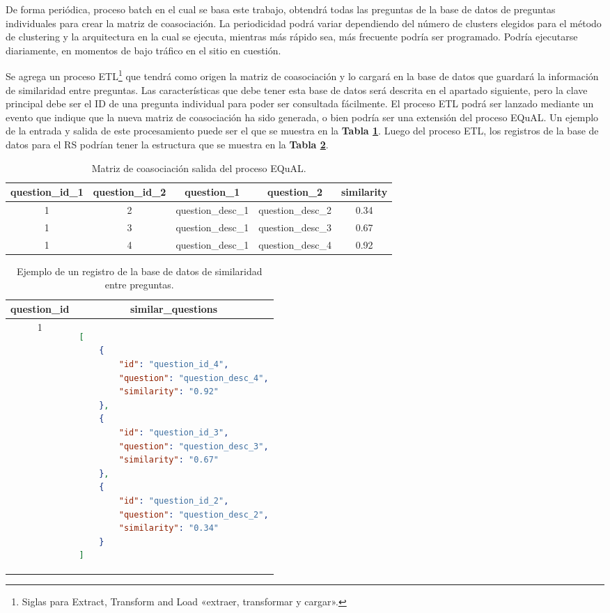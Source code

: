 \bigskip De forma periódica, proceso batch en el cual se basa este trabajo, obtendrá todas las preguntas de la base de datos de preguntas individuales para crear la matriz de coasociación. La periodicidad podrá variar dependiendo del número de clusters elegidos para el método de clustering y la arquitectura en la cual se ejecuta, mientras más rápido sea, más frecuente podría ser programado. Podría ejecutarse diariamente, en momentos de bajo tráfico en el sitio en cuestión.

\bigskip Se agrega un proceso ETL\footnote{Siglas para Extract, Transform and Load «extraer, transformar y cargar».} que tendrá como origen la matriz de coasociación y lo cargará en la base de datos que guardará la información de similaridad entre preguntas.  Las características que debe tener esta base de datos será descrita en el apartado siguiente, pero la clave principal debe ser el ID de una pregunta individual para poder ser consultada fácilmente. El proceso ETL podrá ser lanzado mediante un evento que indique que la nueva matriz de coasociación ha sido generada, o bien podría ser una extensión del proceso EQuAL. Un ejemplo de la entrada y salida de este procesamiento puede ser el que se muestra en la \textbf{Tabla \ref{tab:table-co-asociation}}. Luego del proceso ETL, los registros de la base de datos para el RS podrían tener la estructura que se muestra en la \textbf{Tabla \ref{tab:table-similar-questions}}.

\begin{table}[]
	\centering
	\begin{tabular}{|c|c|c|c|c|}
		\hline
		\textbf{question\_id\_1} & \textbf{question\_id\_2} & \textbf{question\_1} & \textbf{question\_2} & \textbf{similarity} \\ \hline
		1 & 2 & question\_desc\_1 & question\_desc\_2 & 0.34 \\ \hline
		1 & 3 & question\_desc\_1 & question\_desc\_3 & 0.67 \\ \hline
		1 & 4 & question\_desc\_1 & question\_desc\_4 & 0.92 \\ \hline
	\end{tabular}
	\caption{Matriz de coasociación salida del proceso EQuAL.}
	\label{tab:table-co-asociation}
\end{table}

\begin{table}[]
	\centering
	\begin{tabular}{|c|l|}
		\hline
		\textbf{question\_id} &
		\multicolumn{1}{c|}{\textbf{similar\_questions}} \\ \hline
		1 & \begin{lstlisting}[language=json]
[
	{
		"id": "question_id_4",
		"question": "question_desc_4",
		"similarity": "0.92"
	},
	{
		"id": "question_id_3",
		"question": "question_desc_3",
		"similarity": "0.67"
	},
	{
		"id": "question_id_2",
		"question": "question_desc_2",
		"similarity": "0.34"
	}
]
		\end{lstlisting} \\ \hline
	\end{tabular}
	\caption{Ejemplo de un registro de la base de datos de similaridad entre preguntas.}
	\label{tab:table-similar-questions}
\end{table}

